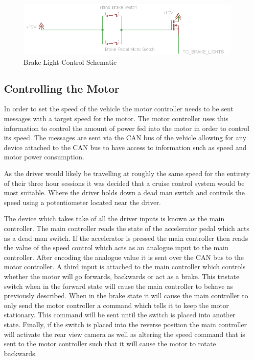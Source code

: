 \begin{figure}[H]
\includegraphics[width=\columnwidth]{figures/BrakeLightControl}%
\caption{Brake Light Control Schematic}
\label{Fig:BrakeLightsWiring}
\end{figure}

\subsection{Controlling the Motor}
In order to set the speed of the vehicle the motor controller needs to be sent messages with a target speed for the motor. The motor controller uses this information to control the amount of power fed into the motor in order to control its speed. The messages are sent via the CAN bus of the vehicle allowing for any device attached to the CAN bus to have access to information such as speed and motor power consumption. 

As the driver would likely be travelling at roughly the same speed for the entirety of their three hour sessions it was decided that a cruise control system would be most suitable. Where the driver holds down a dead man switch and controls the speed using a potentiometer located near the driver.

The device which takes take of all the driver inputs is known as the main controller. The main controller reads the state of the accelerator pedal which acts as a dead man switch. If the accelerator is pressed the main controller then reads the value of the speed control which acts as an analogue input to the main controller. After encoding the analogue value it is sent over the CAN bus to the motor controller. A third input is attached to the main controller which controls whether the motor will go forwards, backwards or act as a brake. This tristate switch when in the forward state will cause the main controller to behave as previously described. When in the brake state it will cause the main controller to only send the motor controller a command which tells it to keep the motor stationary. This command will be sent until the switch is placed into another state. Finally, if the switch is placed into the reverse position the main controller will activate the rear view camera as well as altering the speed command that is sent to the motor controller such that it will cause the motor to rotate backwards.

